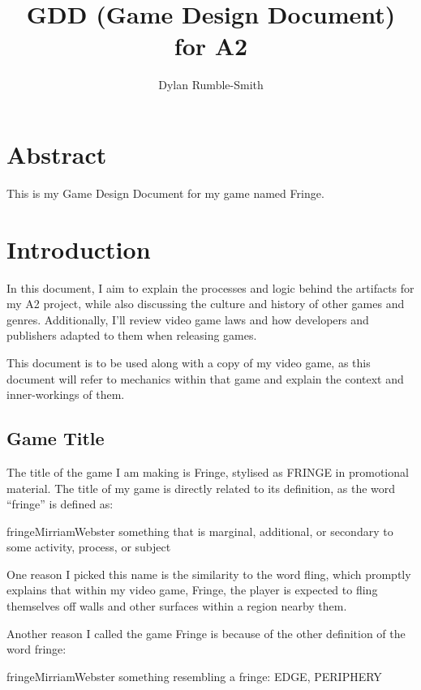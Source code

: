 \documentclass[12pt]{article}
\title{GDD (Game Design Document) for A2}
\author{Dylan Rumble-Smith}
\begin{document}
	{\setlength{\parskip}{0pt}%
		\maketitle
		
		\section*{\centering Abstract}
		\begin{adjustwidth}{90pt}{90pt}
			This is my Game Design Document for my game named Fringe.
		\end{adjustwidth}
		\pagebreak
		\tableofcontents
		\pagebreak
		}
	
	\section{Introduction}
	In this document, I aim to explain the processes and logic behind the artifacts for my A2 project, while also discussing the culture and history of other games and genres. Additionally, I'll review video game laws and how developers and publishers adapted to them when releasing games.
	
	This document is to be used along with a copy of my video game, as this document will refer to mechanics within that game and explain the context and inner-workings of them.
	\subsection{Game Title}
	The title of the game I am making is Fringe, stylised as FRINGE in promotional material. The title of my game is directly related to its definition, as the word “fringe” is defined as:
	\begin{displaycquote}{fringeMirriamWebster}
		something that is marginal, additional, or secondary to some activity, process, or subject
	\end{displaycquote}
	
	One reason I picked this name is the similarity to the word fling, which promptly explains that within my video game, Fringe, the player is expected to fling themselves off walls and other surfaces within a region nearby them.
	
	Another reason I called the game Fringe is because of the other definition of the word fringe:
	\begin{displaycquote}{fringeMirriamWebster}
		something resembling a fringe: EDGE, PERIPHERY
	\end{displaycquote}
	
\end{document}
